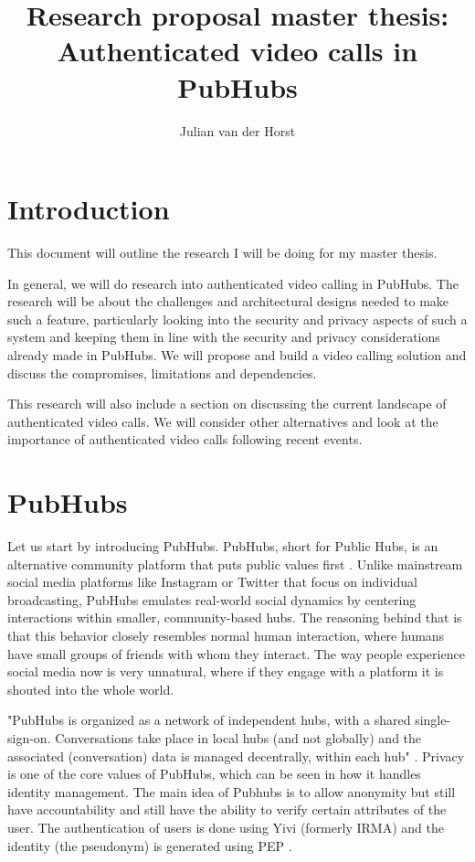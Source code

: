 \documentclass[11pt,a4paper]{article}
\title{Research proposal master thesis: \\ Authenticated video calls in PubHubs}
\author{Julian van der Horst}
\begin{document}
 
\maketitle
\section{Introduction}
This document will outline the research I will be doing for my master thesis.

In general, we will do research into authenticated video calling in PubHubs. The research will be about the challenges and architectural designs needed to make such a feature, particularly looking into the security and privacy aspects of such a system and keeping them in line with the security and privacy considerations already made in PubHubs. We will propose and build a video calling solution and discuss the compromises, limitations and dependencies. 

This research will also include a section on discussing the current landscape of authenticated video calls. We will consider other alternatives and look at the importance of authenticated video calls following recent events.

\section{PubHubs}
Let us start by introducing PubHubs. PubHubs, short for Public Hubs, is an alternative community platform that puts public values first \cite{PH}. Unlike mainstream social media platforms like Instagram or Twitter that focus on individual broadcasting, PubHubs emulates real-world social dynamics by centering interactions within smaller, community-based hubs. The reasoning behind that is that this behavior closely resembles normal human interaction, where humans have small groups of friends with whom they interact. The way people experience social media now is very unnatural, where if they engage with a platform it is shouted into the whole world.

"PubHubs is organized as a network of independent hubs, with a shared single-sign-on. Conversations take place in local hubs (and not globally) and the associated (conversation) data is managed decentrally, within each hub" \cite{PH}. Privacy is one of the core values of PubHubs, which can be seen in how it handles identity management. The main idea of Pubhubs is to allow anonymity but still have accountability and still have the ability to verify certain attributes of the user. The authentication of users is done using Yivi (formerly IRMA)\cite{YIVI} and the identity (the pseudonym) is generated using PEP \cite{PEP}.
\end{document}
